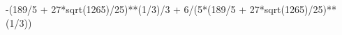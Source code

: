 \documentclass[preview]{standalone}
\begin{document}
\begin{center}
-(189/5 + 27*sqrt(1265)/25)**(1/3)/3 + 6/(5*(189/5 + 27*sqrt(1265)/25)**(1/3))
\end{center}
\end{document}
